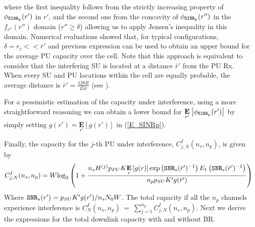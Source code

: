 where the first inequality follows from the strictly increasing property of $\phi_{\text{\ttfamily{SINR}}_{p}}(r')$ in $r'$, and the second one from the concavity of $\phi_{\text{\ttfamily{SINR}}_{p}}(r'')$ in the $f_{r''}(r'')$ domain ($r''\geq\delta$) allowing us to apply Jensen's inequality in this domain. Numerical evaluations showed that, for typical configurations, $\delta=r_{c}<<\bar{r}'$ and previous expression can be used to obtain an upper bound for the average PU capacity over the cell. Note that this approach is equivalent to consider that the interfering SU is located at a distance $\bar{r}'$ from the PU Rx. When every SU and PU locations within the cell are equally probable, the average distance is $\bar{r}' = \frac{128R}{45\pi}$ (see \cite{ref:Solomon1978}). 

For a pessimistic estimation of the capacity under interference, using a more straightforward reasoning we can obtain a lower bound for $\underset{r'}{\mathbf{E}}\left[\phi_{\text{\ttfamily{SINR}}_{p}}(r')\right]$ by simply setting $g(r')=\underset{r'}{\mathbf{E}}\left[g(r')\right]$ in (\ref{E_SINRp}).


Finally, the capacity for the $j$-th PU under interference, $C^{I}_{j,N}(n_{s},n_{p})$, is given by
\begin{equation}\label{CIjN}
C^{I}_{j,N}(n_{s},n_{p}) = \\
W\text{log}_{2}\left(1+
\frac{n_{s}H^{(j)}p_{PU}K\underset{r}{\mathbf{E}}\left[g(r)\right]\text{exp}\left(\text{\ttfamily{SNR}}_{s}(\bar{r}')^{-1}\right)E_{1}\left(\text{\ttfamily{SNR}}_{s}(\bar{r}')^{-1}\right)}
{n_{p}p_{SU}K'g(\bar{r}')}\right)
\end{equation}
Where $\text{\ttfamily{SNR}}_{s}(r') = p_{SU}K'g(r')/n_{s}N_{0}W$.
The total capacity if all the $n_{p}$ channels experience interference is $C^{I}_{N}(n_{s},n_{p})~=~\sum_{j=1}^{n_{p}}C^{I}_{j,N}(n_{s},n_{p})$.
Next we derive the expressions for the total downlink capacity with and without BR.



